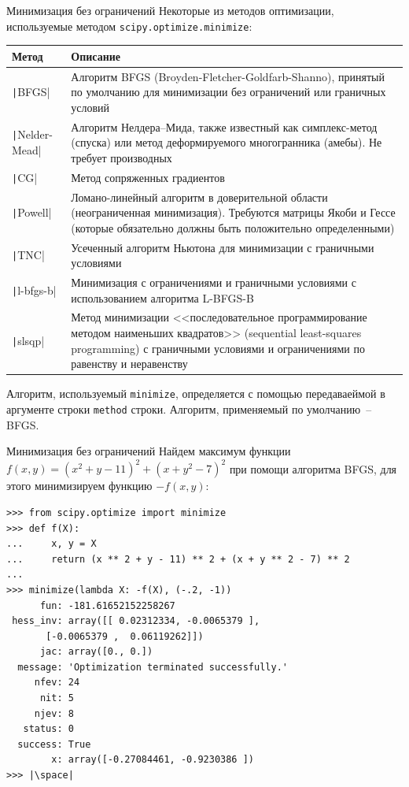 \documentclass[aspectratio=169, mathserif]{beamer}	%
\begin{document}
\begin{frame}[fragile]{Минимизация без ограничений}
\scriptsize
Некоторые из методов оптимизации, используемые методом \texttt{scipy.optimize.minimize}:
\begin{table}[h!]
\begin{tabular}{|p{}|p{}|}
\hline
\textbf{Метод} & \textbf{Описание} \\
\hline
\texttt|BFGS| & Алгоритм BFGS (Broyden-Fletcher-Goldfarb-Shanno), принятый по умолчанию для минимизации без ограничений или граничных условий \\
\hline
\texttt|Nelder-Mead| & Алгоритм Нелдера–Мида, также известный как симплекс-метод (спуска) или
метод деформируемого многогранника (амебы). Не требует производных \\
\hline
\texttt|CG| & Метод сопряженных градиентов \\
\hline
\texttt|Powell| & Ломано-линейный алгоритм в доверительной области (неограниченная минимизация). Требуются матрицы Якоби и Гессе (которые обязательно должны быть положительно определенными) \\
\hline
\texttt|TNC| & Усеченный алгоритм Ньютона для минимизации с граничными условиями \\
\hline
\texttt|l-bfgs-b| & Минимизация с ограничениями и граничными условиями с использованием алгоритма L-BFGS-B \\
\hline
\texttt|slsqp| & Метод минимизации <<последовательное программирование методом наименьших квадратов>> (sequential least-squares programming) с граничными условиями и ограничениями по равенству и неравенству \\
\hline
\end{tabular}
\end{table}
\vfill
Алгоритм, используемый \texttt{minimize}, определяется с помощью передаваеймой в аргументе строки \texttt{method} строки. Алгоритм, применяемый по умолчанию~-- BFGS.
\vfill
\end{frame}


\begin{frame}[fragile]{Минимизация без ограничений}
\scriptsize
Найдем максимум функции $f\left(x, y\right) = \left(x^2 + y - 11\right)^2 + \left(x + y^2 - 7\right)^2$ при помощи алгоритма BFGS, для этого минимизируем функцию $-f\left(x, y\right)$:
\vfill
\begin{verbatim}
>>> from scipy.optimize import minimize
>>> def f(X):
...     x, y = X
...     return (x ** 2 + y - 11) ** 2 + (x + y ** 2 - 7) ** 2
...
>>> minimize(lambda X: -f(X), (-.2, -1))
      fun: -181.61652152258267
 hess_inv: array([[ 0.02312334, -0.0065379 ],
       [-0.0065379 ,  0.06119262]])
      jac: array([0., 0.])
  message: 'Optimization terminated successfully.'
     nfev: 24
      nit: 5
     njev: 8
   status: 0
  success: True
        x: array([-0.27084461, -0.9230386 ])
>>> |\space|
\end{verbatim}
\vfill
\end{frame}
\end{document}
